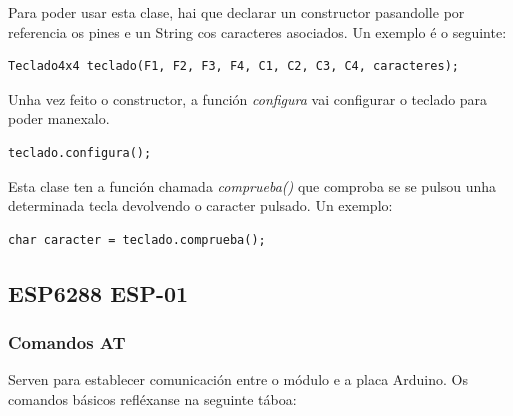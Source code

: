 \documentclass[11pt,twoside]{book}
\begin{document}
Para poder usar esta clase, hai que declarar un constructor pasandolle por referencia os pines e un String cos caracteres asociados. Un exemplo é o seguinte:

\begin{verbatim}
Teclado4x4 teclado(F1, F2, F3, F4, C1, C2, C3, C4, caracteres);
\end{verbatim}

Unha vez feito o constructor, a función \textit{configura} vai configurar o teclado para poder manexalo.

\begin{verbatim}
teclado.configura();
\end{verbatim}

Esta clase ten a función chamada \textit{comprueba()} que comproba se se pulsou unha determinada tecla devolvendo o caracter pulsado. Un exemplo:

\begin{verbatim}
char caracter = teclado.comprueba();
\end{verbatim}


\subsection{ESP6288 ESP-01}

\subsubsection{Comandos AT}

Serven para establecer comunicación entre o módulo e a placa Arduino. Os comandos básicos refléxanse na seguinte táboa:
\end{document}
